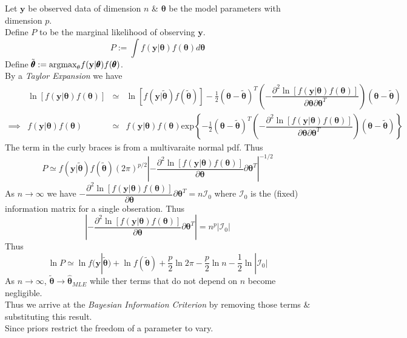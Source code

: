\documentclass[11pt,a4paper]{article}
\begin{document}
Let $\textbf{y}$ be observed data of dimension $n$ \& $\pmb\theta$ be the model parameters with dimension $p$.\\
Define $P$ to be the marginal likelihood of observing $\textbf{y}$.
$$P:=\int f(\textbf{y}|\pmb\theta)f(\pmb\theta)d\pmb\theta$$
Define $\tilde{\pmb\theta}:=\text{argmax}_\theta f(\textbf{y}|\pmb\theta)f(\pmb\theta)$.\\
By a \textit{Taylor Expansion} we have
\[\begin{array}{rrcl}
&\ln[f(\textbf{y}|\pmb\theta)f(\pmb\theta)]&\simeq&\ln[f(\textbf{y}|\tilde{\pmb\theta})f(\tilde{\pmb\theta})]-\frac12(\pmb\theta-\tilde{\pmb\theta})^T\left(-\dfrac{\partial^2\ln[f(\textbf{y}|\pmb\theta)f(\pmb\theta)]}{\partial\pmb\theta\partial\pmb\theta^T}\right)(\pmb\theta-\tilde{\pmb\theta})\\
\implies&f(\textbf{y}|\pmb\theta)f(\pmb\theta)&\simeq&f(\textbf{y}|\pmb\theta)f(\pmb\theta)\text{exp}\left\{-\frac12(\pmb\theta-\tilde{\pmb\theta})^T\left(-\dfrac{\partial^2\ln[f(\textbf{y}|\pmb\theta)f(\pmb\theta)]}{\partial\pmb\theta\partial\pmb\theta^T}\right)(\pmb\theta-\tilde{\pmb\theta})\right\}
\end{array}\]
The term in the curly braces is from a multivaraite normal pdf. Thus
$$P\simeq f(\textbf{y}|\tilde{\pmb\theta})f(\tilde{\pmb\theta})(2\pi)^{p/2}\left|-\frac{\partial^2\ln[f(\textbf{y}|\pmb\theta)f(\pmb\theta)]}{\partial\pmb\theta}{\partial\pmb\theta^T}\right|^{-1/2}$$
As $n\to\infty$ we have $-\dfrac{\partial^2\ln[f(\textbf{y}|\pmb\theta)f(\pmb\theta)]}{\partial\pmb\theta}{\partial\pmb\theta^T}=n\mathcal{I}_0$ where $\mathcal{I}_0$ is the (fixed) information matrix for a single obseration. Thus
$$\left|-\frac{\partial^2\ln[f(\textbf{y}|\pmb\theta)f(\pmb\theta)]}{\partial\pmb\theta}{\partial\pmb\theta^T}\right|=n^p|\mathcal{I}_0|$$
Thus
$$\ln P\simeq\ln f(\textbf{y}|\tilde{\pmb\theta})+\ln f(\tilde{\pmb\theta})+\frac{p}2\ln2\pi-\frac{p}2\ln n-\frac12\ln|\mathcal{I}_0|$$
As $n\to\infty$, $\tilde{\pmb\theta}\to\hat{\pmb\theta}_{MLE}$ while ther terms that do not depend on $n$ become negligible.\\
Thus we arrive at the \textit{Bayesian Information Criterion} by removing those terms \& substituting this result.\\

Since priors restrict the freedom of a parameter to vary.\\
\end{document}
